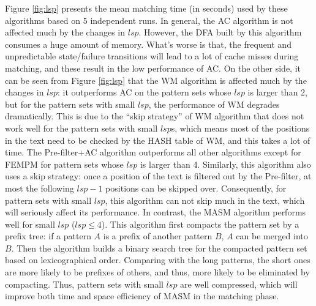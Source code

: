 Figure \ref{fig:lsp} presents the mean matching time (in seconds) used
by these algorithms based on 5 independent runs. In general, the
\textsf{AC} algorithm is not affected much by the changes in
$lsp$. However, the DFA built by this algorithm consumes a huge amount
of memory. What's worse is that, the frequent and unpredictable
state/failure transitions will lead to a lot of cache misses during
matching, and these result in the low performance of \textsf{AC}. On
the other side, it can be seen from Figure \ref{fig:lsp} that the
\textsf{WM} algorithm is affected much by the changes in $lsp$: it
outperforms \textsf{AC} on the pattern sets whose $lsp$ is larger than
2, but for the pattern sets with small $lsp$, the performance of
\textsf{WM} degrades dramatically. This is due to the ``skip
strategy'' of \textsf{WM} algorithm that does not work well for the
pattern sets with small $lsp$s, which means most of the positions in
the text need to be checked by the HASH table of \textsf{WM}, and this
takes a lot of time. The \textsf{Pre-filter+AC} algorithm outperforms
all other algorithms except for \textsf{FEMPM} for pattern sets whose
$lsp$ is larger than 4. Similarly, this algorithm also uses a skip
strategy: once a position of the text is filtered out by the
Pre-filter, at most the following $lsp-1$ positions can be skipped
over. Consequently, for pattern sets with small $lsp$, this algorithm
can not skip much in the text, which will seriously affect its
performance. In contrast, the \textsf{MASM} algorithm performs well
for small $lsp$ ($lsp \leq 4$). This algorithm first compacts the
pattern set by a prefix tree: if a pattern $A$ is a prefix of another
pattern $B$, $A$ can be merged into $B$. Then the algorithm builds a
binary search tree for the compacted pattern set based on
lexicographical order. Comparing with the long patterns, the short
ones are more likely to be prefixes of others, and thus, more likely
to be eliminated by compacting. Thus, pattern sets with small $lsp$
are well compressed, which will improve both time and space efficiency
of \textsf{MASM} in the matching phase.

